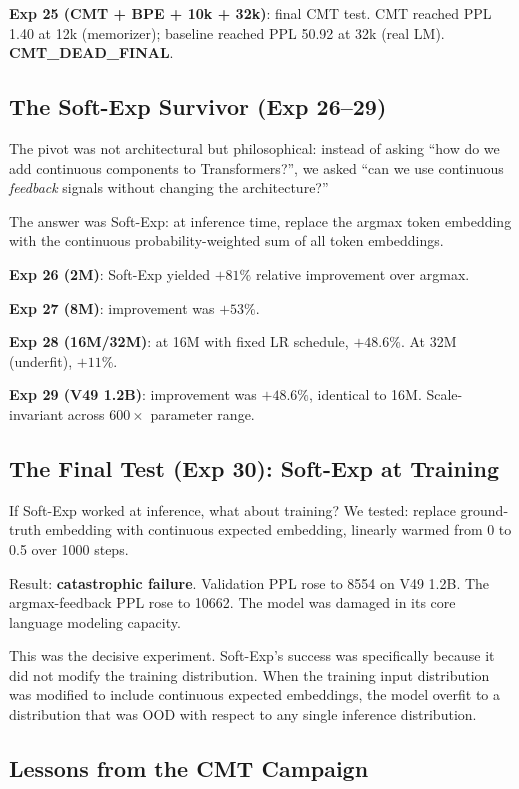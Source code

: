 \documentclass{article}
\begin{document}
\textbf{Exp 25 (CMT + BPE + 10k + 32k)}: final CMT test. CMT reached PPL 1.40 at 12k (memorizer); baseline reached PPL 50.92 at 32k (real LM). \textbf{CMT\_DEAD\_FINAL}.

\subsection{The Soft-Exp Survivor (Exp 26--29)}

The pivot was not architectural but philosophical: instead of asking ``how do we add continuous components to Transformers?'', we asked ``can we use continuous \emph{feedback} signals without changing the architecture?''

The answer was Soft-Exp: at inference time, replace the argmax token embedding with the continuous probability-weighted sum of all token embeddings.

\textbf{Exp 26 (2M)}: Soft-Exp yielded $+81\%$ relative improvement over argmax.

\textbf{Exp 27 (8M)}: improvement was $+53\%$.

\textbf{Exp 28 (16M/32M)}: at 16M with fixed LR schedule, $+48.6\%$. At 32M (underfit), $+11\%$.

\textbf{Exp 29 (V49 1.2B)}: improvement was $+48.6\%$, identical to 16M. Scale-invariant across $600\times$ parameter range.

\subsection{The Final Test (Exp 30): Soft-Exp at Training}

If Soft-Exp worked at inference, what about training? We tested: replace ground-truth embedding with continuous expected embedding, linearly warmed from 0 to 0.5 over 1000 steps.

Result: \textbf{catastrophic failure}. Validation PPL rose to 8554 on V49 1.2B. The argmax-feedback PPL rose to 10662. The model was damaged in its core language modeling capacity.

This was the decisive experiment. Soft-Exp's success was specifically because it did not modify the training distribution. When the training input distribution was modified to include continuous expected embeddings, the model overfit to a distribution that was OOD with respect to any single inference distribution.

\subsection{Lessons from the CMT Campaign}
\end{document}
